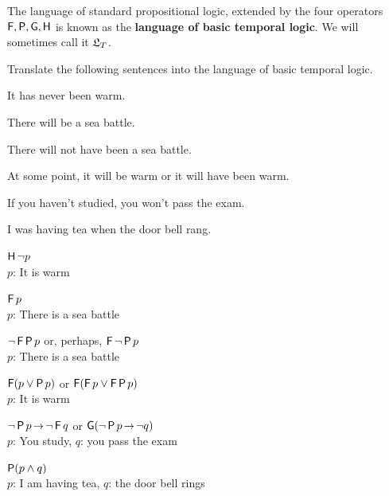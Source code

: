 The language of standard propositional logic, extended by the four operators
$\operatorname{\mathsf{F}},\operatorname{\mathsf{P}},\operatorname{\mathsf{G}},\operatorname{\mathsf{H}}$ is known as the \textbf{language of basic temporal logic}. We
will sometimes call it $\mathfrak{L}_T$.


\begin{exercise}
  Translate the following sentences into the language of basic temporal logic.
  \begin{exlist}
  \item It has never been warm. %
  \item There will be a sea battle. %
  \item There will not have been a sea battle. %
  \item At some point, it will be warm or it will have been warm. %
  \item If you haven't studied, you won't pass the exam. %
  \item I was having tea when the door bell rang. %
  \end{exlist}
\end{exercise}
\begin{solution}
  \begin{sollist}
  \item $\operatorname{\mathsf{H}} \neg p$\\
    $p$: It is warm\\[-2mm]
  \item $\operatorname{\mathsf{F}} p$\\
    $p$: There is a sea battle\\[-2mm]
  \item $\neg \operatorname{\mathsf{F}} \operatorname{\mathsf{P}} p$ or, perhaps, $\operatorname{\mathsf{F}}\neg \operatorname{\mathsf{P}} p$\\
    $p$: There is a sea battle\\[-2mm]
  \item  $\operatorname{\mathsf{F}}(p \lor \operatorname{\mathsf{P}} p)$ or $\operatorname{\mathsf{F}}(\operatorname{\mathsf{F}} p \lor \operatorname{\mathsf{F}}\operatorname{\mathsf{P}} p)$\\
    $p$: It is warm\\[-2mm]
  \item $\neg \tP p \to \neg \tF q$ or $\tG(\neg\tP p \to \neg q)$\\
    $p$: You study, $q$: you pass the exam\\[-2mm]
  \item $\operatorname{\mathsf{P}}(p \land q)$\\
    $p$: I am having tea, $q$: the door bell rings
  \end{sollist}
\end{solution}


